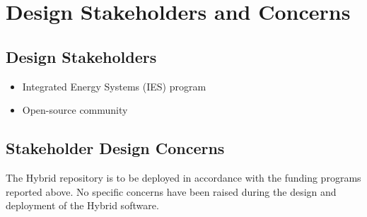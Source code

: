 \section{Design Stakeholders and Concerns}
\subsection{Design Stakeholders}
\begin{itemize}
  \item Integrated Energy Systems (IES) program 
  \item Open-source community 
\end{itemize}
\subsection{Stakeholder Design Concerns}
The Hybrid repository is to be deployed in accordance with the funding programs reported above. No specific concerns have been raised during the design and deployment of the Hybrid software.
